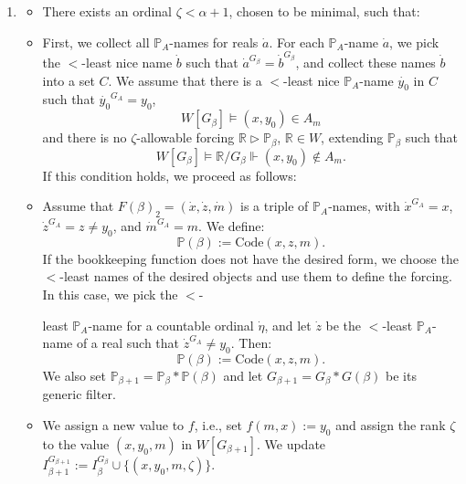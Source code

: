 \documentclass[a4paper,11pt]{article}
\newcommand{\forceP}{\mathbb{P}}
\newcommand{\forceR}{\mathbb{R}}
\begin{document}
\begin{enumerate}
\item[(a)]  
  \begin{itemize}
  \item[] There exists an ordinal \( \zeta < \alpha+1 \), chosen to be minimal, such that:
  \item[] First, we collect all \( \forceP_A \)-names for reals \( \dot{a} \). For each \( \forceP_A \)-name \( \dot{a} \), we pick the \( < \)-least nice name \( \dot{b} \) such that \( \dot{a}^{G_{\beta}} = \dot{b}^{G_{\beta}} \), and collect these names \( \dot{b} \) into a set \( C \). We assume that there is a \( < \)-least nice \( \forceP_A \)-name \( \dot{y_0} \) in \( C \) such that \( \dot{y_0}^{G_A} = y_0 \), 
  \[
  W[G_{\beta}] \models (x, y_0) \in A_m
  \]
  and there is no \( \zeta \)-allowable forcing \( \forceR \triangleright \forceP_{\beta} \), \( \forceR \in W \), extending \( \forceP_{\beta} \) such that 
  \[
  W[G_{\beta}] \models \forceR / G_{\beta} \Vdash (x, y_0) \notin A_m.
  \]
  If this condition holds, we proceed as follows:
  \end{itemize}

  \begin{itemize}
  \item Assume that \( F(\beta)_2 = (\dot{x}, \dot{z}, \dot{m}) \) is a triple of \( \forceP_A \)-names, with \( \dot{x}^{G_A} = x \), \( \dot{z}^{G_A} = z \neq y_0 \), and \( \dot{m}^{G_A} = m \). We define:
  \[
  \forceP(\beta) := \text{Code}(x, z, m).
  \]
  If the bookkeeping function does not have the desired form, we choose the \( < \)-least names of the desired objects and use them to define the forcing. In this case, we pick the \( < \)-

least \( \forceP_A \)-name for a countable ordinal \( \dot{\eta} \), and let \( \dot{z} \) be the \( < \)-least \( \forceP_A \)-name of a real such that \( \dot{z}^{G_A} \neq y_0 \). Then:
  \[
  \forceP(\beta) := \text{Code}(x, z, m).
  \]
  We also set \( \forceP_{\beta+1} = \forceP_{\beta} \ast \forceP(\beta) \) and let \( G_{\beta+1} = G_{\beta} \ast G(\beta) \) be its generic filter.

  \item We assign a new value to \( f \), i.e., set \( f(m, x) := y_0 \) and assign the rank \( \zeta \) to the value \( (x, y_0, m) \) in \( W[G_{\beta+1}] \). We update \( I_{\beta+1}^{G_{\beta+1}} := I_{\beta}^{G_{\beta}} \cup \{ (x, y_0, m, \zeta) \} \).
  \end{itemize}


\end{enumerate}
\end{document}
